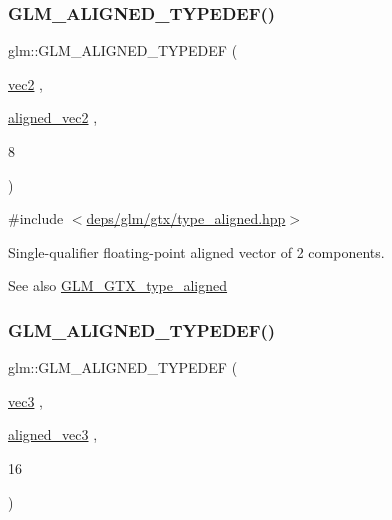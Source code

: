 \subsubsection{\texorpdfstring{G\+L\+M\+\_\+\+A\+L\+I\+G\+N\+E\+D\+\_\+\+T\+Y\+P\+E\+D\+E\+F()}{GLM\_ALIGNED\_TYPEDEF()}\hspace{0.1cm}{\footnotesize\ttfamily [144/209]}}
{\footnotesize\ttfamily glm\+::\+G\+L\+M\+\_\+\+A\+L\+I\+G\+N\+E\+D\+\_\+\+T\+Y\+P\+E\+D\+EF (\begin{DoxyParamCaption}\item[{\hyperlink{group__core__types_gaa1618f51db67eaa145db101d8c8431d8}{vec2}}]{,  }\item[{\hyperlink{group__gtc__type__aligned_ga8f4a38f220c72d218dbdc7bc1d06a1a2}{aligned\+\_\+vec2}}]{,  }\item[{8}]{ }\end{DoxyParamCaption})}



{\ttfamily \#include $<$\hyperlink{gtx_2type__aligned_8hpp}{deps/glm/gtx/type\+\_\+aligned.\+hpp}$>$}

Single-\/qualifier floating-\/point aligned vector of 2 components. \begin{DoxySeeAlso}{See also}
\hyperlink{group__gtx__type__aligned}{G\+L\+M\+\_\+\+G\+T\+X\+\_\+type\+\_\+aligned} 
\end{DoxySeeAlso}
\mbox{\label{group__gtx__type__aligned_gab8d081fac3a38d6f55fa552f32168d32}} 
\subsubsection{\texorpdfstring{G\+L\+M\+\_\+\+A\+L\+I\+G\+N\+E\+D\+\_\+\+T\+Y\+P\+E\+D\+E\+F()}{GLM\_ALIGNED\_TYPEDEF()}\hspace{0.1cm}{\footnotesize\ttfamily [145/209]}}
{\footnotesize\ttfamily glm\+::\+G\+L\+M\+\_\+\+A\+L\+I\+G\+N\+E\+D\+\_\+\+T\+Y\+P\+E\+D\+EF (\begin{DoxyParamCaption}\item[{\hyperlink{group__core__types_ga1c47e8b3386109bc992b6c48e91b0be7}{vec3}}]{,  }\item[{\hyperlink{group__gtc__type__aligned_ga9c54536a3becfd10a44f6b1b8c4aa3d3}{aligned\+\_\+vec3}}]{,  }\item[{16}]{ }\end{DoxyParamCaption})}



